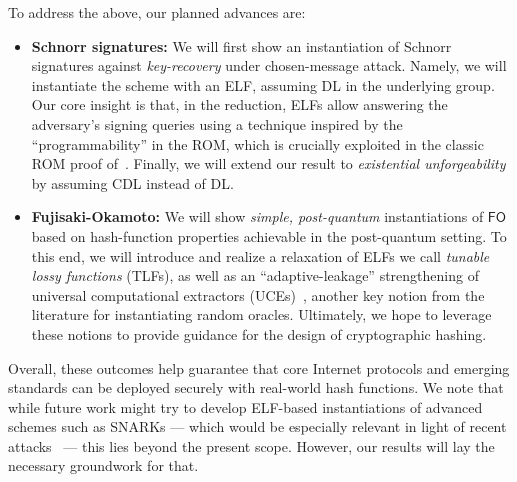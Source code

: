   To address the above, our planned advances are:
\begin{itemize}
    \item 	\textbf{Schnorr signatures:} We will first show an instantiation of Schnorr signatures against \emph{key-recovery} under chosen-message attack. Namely,  we will instantiate the scheme with an ELF, assuming DL in the underlying group. Our core insight is that, in the reduction,  ELFs allow answering the adversary's signing queries  using a technique inspired by the ``programmability'' in the ROM, which is crucially exploited in the classic ROM proof of~\cite{EC:PoiSte96}. Finally, we will  extend our result to \emph{existential  unforgeability} by assuming CDL instead of DL. %
    \item \textbf{Fujisaki-Okamoto:} 
We will show \emph{simple, post-quantum} instantiations of $\mathsf{FO}$ based on hash-function properties achievable in the post-quantum setting. To this end, we will introduce and realize a relaxation of ELFs we call \emph{tunable lossy functions} (TLFs), as well as an ``adaptive-leakage'' strengthening of universal computational extractors (UCEs)~\cite{C:BelHoaKee13}, another key notion from the literature for instantiating random oracles. Ultimately, we hope to leverage these notions to provide guidance for the design of cryptographic hashing.

\end{itemize}    

\noindent Overall, these outcomes  help guarantee that core Internet protocols and emerging  standards can be deployed securely with real-world hash functions.
We note that while future work might try to  develop ELF-based instantiations of advanced schemes such as SNARKs --- which would be especially relevant in light of recent attacks~\cite{KRS25} --- this lies beyond the present scope. However, our results will lay the necessary groundwork for that.


